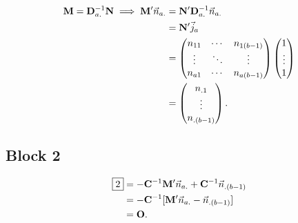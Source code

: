 \begin{align*}
    \mathbf{M}
    =\mathbf{D}_{a.}^{-1}\mathbf{N}
    \implies \mathbf{M}'\vec{n}_{a.} & =\mathbf{N}'\mathbf{D}_{a.}^{-1}\vec{n}_{a.} \\
                                        & =\mathbf{N}'\vec{j}_a                        \\
                                        & =\begin{pmatrix}
                                               n_{11} & \cdots & n_{1(b-1)} \\
                                               \vdots & \ddots & \vdots     \\
                                               n_{a1} & \cdots & n_{a(b-1)}
                                           \end{pmatrix}\begin{pmatrix}
                                                            1      \\
                                                            \vdots \\
                                                            1
                                                        \end{pmatrix}                   \\
                                        & =\begin{pmatrix}
                                               n_{.1} \\
                                               \vdots \\
                                               n_{.(b-1)}
                                           \end{pmatrix}.
\end{align*}
\subsection*{Block 2}
\begin{align*}
    \boxed{2}
     & =-\mathbf{C}^{-1}\mathbf{M}'\vec{n}_{a.}+\mathbf{C}^{-1}\vec{n}_{.(b-1)} \\
     & =-\mathbf{C}^{-1}[\mathbf{M}'\vec{n}_{a.}-\vec{n}_{.(b-1)}]              \\
     & =\mathbf{O}.
\end{align*}
